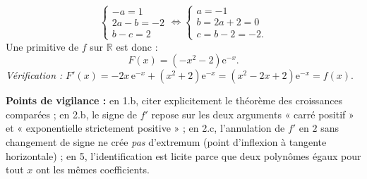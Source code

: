 \documentclass[11pt]{article}
\begin{document}
\begin{corrige}
\begin{enumerate}
\[ \begin{cases} -a = 1 \\ 2a - b = -2 \\ b - c = 2 \end{cases} \iff \begin{cases} a = -1 \\ b = 2a + 2 = 0 \\ c = b - 2 = -2. \end{cases} \]
Une primitive de $f$ sur $\mathbb{R}$ est donc :
\[ F(x) = \left(-x^{2} - 2\right)\mathrm{e}^{-x}. \]
\emph{Vérification :} $F'(x) = -2x\,\mathrm{e}^{-x} + \left(x^{2}+2\right)\mathrm{e}^{-x} = \left(x^{2}-2x+2\right)\mathrm{e}^{-x} = f(x)$. 
\end{enumerate}
\textbf{Points de vigilance :} en 1.b, citer explicitement le théorème des croissances comparées ; en 2.b, le signe de $f'$ repose sur les deux arguments « carré positif » et « exponentielle strictement positive » ; en 2.c, l'annulation de $f'$ en $2$ sans changement de signe ne crée \emph{pas} d'extremum (point d'inflexion à tangente horizontale) ; en 5, l'identification est licite parce que deux polynômes égaux pour tout $x$ ont les mêmes coefficients.
\end{corrige}
\end{document}
